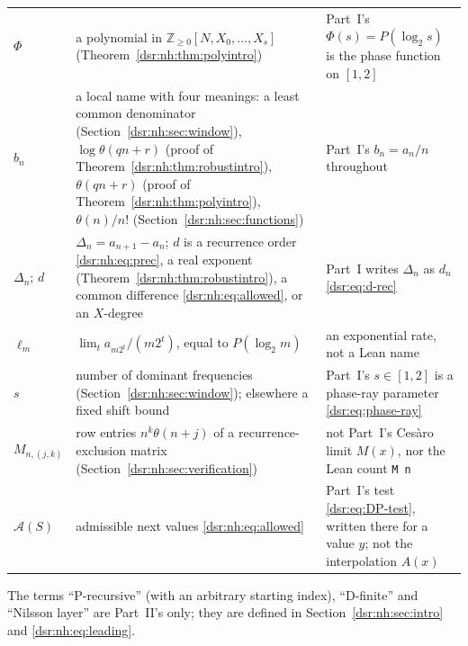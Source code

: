 \documentclass[11pt,a4paper]{article}
\numberwithin{equation}{section}
\theoremstyle{definition}
\theoremstyle{remark}
\newcommand{\Z}{\mathbb Z}
\newcommand{\lean}[1]{\nolinkurl{#1}}
\theoremstyle{definition}
\theoremstyle{plain}
\begin{document}
\begin{center}
\begin{tabularx}{\linewidth}{@{}l>{\raggedright\arraybackslash}X>{\raggedright\arraybackslash}X@{}}
$\Phi$ & a polynomial in $\Z_{\ge0}[N,X_0,\ldots,X_s]$
 (Theorem~\ref{dsr:nh:thm:polyintro}) & Part~I's
 $\Phi(s)=P(\log_2s)$ is the phase function on $[1,2]$\\
$b_n$ & a local name with four meanings: a least common denominator
 (Section~\ref{dsr:nh:sec:window}), $\log\theta(qn+r)$ (proof of
 Theorem~\ref{dsr:nh:thm:robustintro}), $\theta(qn+r)$ (proof of
 Theorem~\ref{dsr:nh:thm:polyintro}), $\theta(n)/n!$
 (Section~\ref{dsr:nh:sec:functions}) & Part~I's $b_n=a_n/n$ throughout\\
$\Delta_n$; $d$ & $\Delta_n=a_{n+1}-a_n$; $d$ is a recurrence order
 \eqref{dsr:nh:eq:prec}, a real exponent (Theorem~\ref{dsr:nh:thm:robustintro}),
 a common difference \eqref{dsr:nh:eq:allowed}, or an $X$-degree &
 Part~I writes $\Delta_n$ as $d_n$ \eqref{dsr:eq:d-rec}\\
$\ell_m$ & $\lim_t a_{m2^t}/(m2^t)$, equal to $P(\log_2m)$ &
 an exponential rate, not a Lean name\\
$s$ & number of dominant frequencies (Section~\ref{dsr:nh:sec:window});
 elsewhere a fixed shift bound & Part~I's $s\in[1,2]$ is a phase-ray
 parameter \eqref{dsr:eq:phase-ray}\\
$M_{n,(j,k)}$ & row entries $n^k\theta(n+j)$ of a recurrence-exclusion
 matrix (Section~\ref{dsr:nh:sec:verification}) & not Part~I's Ces\`aro
 limit $M(x)$, nor the Lean count \lean{M n}\\
$\mathcal A(S)$ & admissible next values \eqref{dsr:nh:eq:allowed} &
 Part~I's test \eqref{dsr:eq:DP-test}, written there for a value $y$;
 not the interpolation $A(x)$\\
\bottomrule
\end{tabularx}
\end{center}
The terms ``P-recursive'' (with an arbitrary starting index), ``D-finite''
and ``Nilsson layer'' are Part~II's only; they are defined in
Section~\ref{dsr:nh:sec:intro} and \eqref{dsr:nh:eq:leading}.
\end{document}

